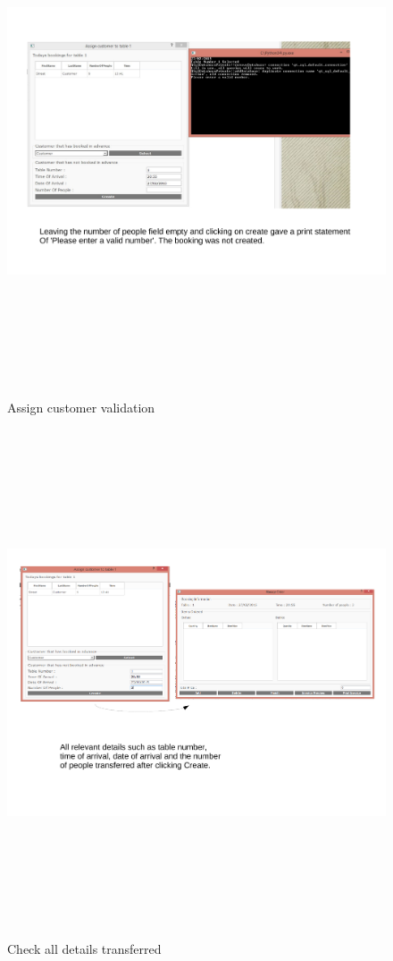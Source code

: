 \begin{landscape}

\begin{figure}[H]
    \includegraphics[height = 15cm]{./Testing/images/test4.pdf}
    \caption{Assign customer validation} \label{fig:Test4}
\end{figure}

\begin{figure}[H]
    \includegraphics[height = 15cm]{./Testing/images/test5.pdf}
    \caption{Check all details transferred} \label{fig:Test5}
\end{figure}


\end{landscape}
